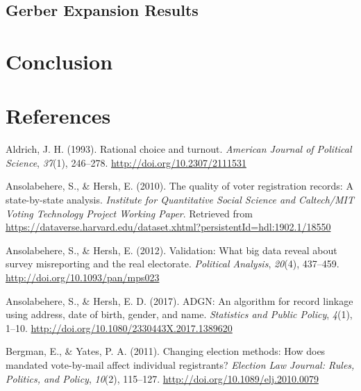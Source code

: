 \documentclass[12pt,twoside]{reedthesis}
\begin{document}
  \section{Gerber Expansion Results}\label{gerber-expansion-results}
  
  \chapter*{Conclusion}\label{conclusion}
  
  \setcounter{chapter}{4} \setcounter{section}{0}
  
  \appendix
  
  \backmatter
  
  \chapter{References}\label{references}
  
  \noindent
  
  \setlength{\parindent}{-0.20in} \setlength{\leftskip}{0.20in}
  \setlength{\parskip}{8pt}
  
  \hypertarget{refs}{}
  \hypertarget{ref-aldrich_rational_1993}{}
  Aldrich, J. H. (1993). Rational choice and turnout. \emph{American
  Journal of Political Science}, \emph{37}(1), 246--278.
  \url{http://doi.org/10.2307/2111531}
  
  \hypertarget{ref-ansolabehere_quality_2010}{}
  Ansolabehere, S., \& Hersh, E. (2010). The quality of voter registration
  records: A state-by-state analysis. \emph{Institute for Quantitative
  Social Science and Caltech/MIT Voting Technology Project Working Paper}.
  Retrieved from
  \url{https://dataverse.harvard.edu/dataset.xhtml?persistentId=hdl:1902.1/18550}
  
  \hypertarget{ref-ansolabehere_validation:_2012}{}
  Ansolabehere, S., \& Hersh, E. (2012). Validation: What big data reveal
  about survey misreporting and the real electorate. \emph{Political
  Analysis}, \emph{20}(4), 437--459.
  \url{http://doi.org/10.1093/pan/mps023}
  
  \hypertarget{ref-ansolabehere_adgn:_2017}{}
  Ansolabehere, S., \& Hersh, E. D. (2017). ADGN: An algorithm for record
  linkage using address, date of birth, gender, and name. \emph{Statistics
  and Public Policy}, \emph{4}(1), 1--10.
  \url{http://doi.org/10.1080/2330443X.2017.1389620}
  
  \hypertarget{ref-bergman_changing_2011}{}
  Bergman, E., \& Yates, P. A. (2011). Changing election methods: How does
  mandated vote-by-mail affect individual registrants? \emph{Election Law
  Journal: Rules, Politics, and Policy}, \emph{10}(2), 115--127.
  \url{http://doi.org/10.1089/elj.2010.0079}
  
\end{document}
